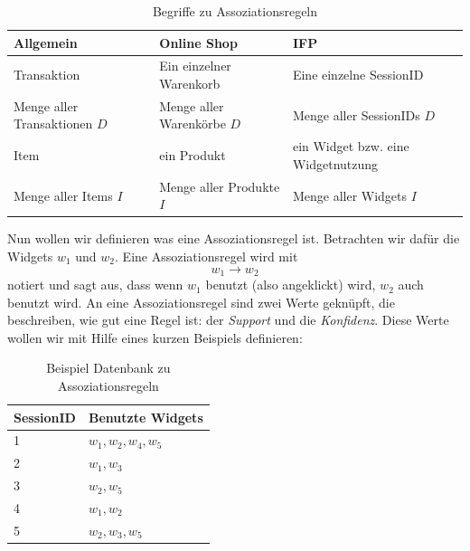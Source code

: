 \begin{table}[htb]
	\begin{center}
		\begin{tabular}{p{4cm}|l|p{5cm}}
			Allgemein & Online Shop & IFP\\
			\hline
			Transaktion & Ein einzelner Warenkorb & Eine einzelne SessionID\\
			\hline
			Menge aller Transaktionen $D$ & Menge aller Warenkörbe $D$ & Menge aller SessionIDs $D$\\
			\hline
			Item & ein Produkt & ein Widget bzw. eine Widgetnutzung\\
			\hline
			Menge aller Items $I$ & Menge aller Produkte $I$ & Menge aller Widgets $I$
		\end{tabular}
		\caption{Begriffe zu Assoziationsregeln}
		\label{tab:begriffe_ar}
	\end{center}
\end{table}

Nun wollen wir definieren was eine Assoziationsregel ist. Betrachten wir dafür die Widgets $w_1$ und $w_2$. Eine Assoziationsregel wird mit \begin{equation*}w_1 \rightarrow w_2\end{equation*} notiert und sagt aus, dass wenn $w_1$ benutzt (also angeklickt) wird, $w_2$ auch benutzt wird. An eine Assoziationsregel sind zwei Werte geknüpft, die beschreiben, wie \glqq gut\grqq{} eine Regel ist: der \textit{Support} und die \textit{Konfidenz}. Diese Werte wollen wir mit Hilfe eines kurzen Beispiels definieren:\\

		\begin{table}[htb]
	\begin{center}
		\begin{tabular}{|l|l|}
			\hline
			SessionID&Benutzte Widgets\\ \hline
			1& $w_1,w_2,w_4,w_5$\\ \hline
			2& $w_1,w_3$\\ \hline
			3& $w_2,w_5$\\ \hline
			4& $w_1,w_2$\\ \hline
			5& $w_2,w_3,w_5$\\ \hline
		\end{tabular}
		\caption{Beispiel Datenbank zu Assoziationsregeln}
		\label{tab:bsp_ar}
	\end{center}
\end{table}

